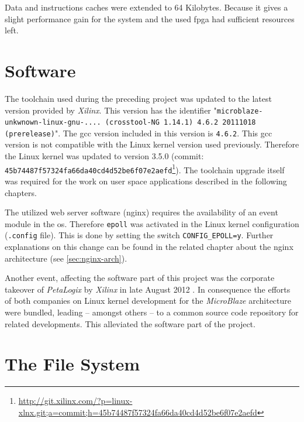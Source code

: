 Data and instructions caches were extended to 64 Kilobytes. Because it gives a slight performance gain for the system and the used \gls{fpga} had sufficient resources left.

\section{Software}

The toolchain used during the preceding project was updated to the latest version provided by \textit{Xilinx}. This version has the identifier "\texttt{microblaze-unkwnown-linux-gnu-.... (crosstool-NG 1.14.1) 4.6.2 20111018 (prerelease)}". The \gls{gcc} version included in this version is \texttt{4.6.2}. This \gls{gcc} version is not compatible with the Linux kernel version used previously. Therefore the Linux kernel was updated to version 3.5.0 (commit: \texttt{45b74487f57324fa66da40cd4d52be6f07e2aefd}\footnote{\url{http://git.xilinx.com/?p=linux-xlnx.git;a=commit;h=45b74487f57324fa66da40cd4d52be6f07e2aefd}}). The toolchain upgrade itself was required for the work on user space applications described in the following chapters.

The utilized web server software (nginx) requires the availability of an event module in the \gls{os}. Therefore \texttt{epoll} was activated in the Linux kernel configuration (\texttt{.config} file). This is done by setting the switch \texttt{CONFIG\_EPOLL=y}. Further explanations on this change can be found in the related chapter about the nginx architecture (see \ref{sec:nginx-arch}).

Another event, affecting the software part of this project was the corporate takeover of \textit{PetaLogix} by \textit{Xilinx} in late August 2012 \cite{takeover}. In consequence the efforts of both companies on Linux kernel development for the \textit{MicroBlaze} architecture were bundled, leading -- amongst others -- to a common source code repository for related developments. This alleviated the software part of the project.

\section{The File System}

